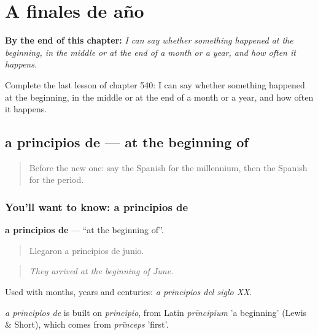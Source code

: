 
\chapter{A finales de año}
\label{ch:es-a-finales-de-ano}

\begin{chapteropening}
\textbf{By the end of this chapter:} \emph{I can say whether something happened at the beginning, in the middle or at the end of a month or a year, and how often it happens.}

Complete the last lesson of chapter 540: I can say whether something happened at the beginning, in the middle or at the end of a month or a year, and how often it happens.
\end{chapteropening}

\section[a principios de]{a principios de — at the beginning of}

\label{lesson:ES-C540-a-principios-de}



\begin{quote}
Before the new one: say the Spanish for the millennium, then the Spanish for the period.
\end{quote}

\subsection*{You'll want to know: a principios de}
\textbf{a principios de} — \textquotedblleft{}at the beginning of\textquotedblright{}.

\begin{quote}
Llegaron a principios de junio.
\end{quote}

\begin{quote}
\emph{They arrived at the beginning of June.}
\end{quote}

Used with months, years and centuries: \emph{a principios del siglo XX}.

\begin{cousinweb}
\emph{a principios de} is built on \emph{principio}, from Latin \emph{prīncipium} 'a beginning' (Lewis \& Short), which comes from \emph{prīnceps} 'first'.
\end{cousinweb}

